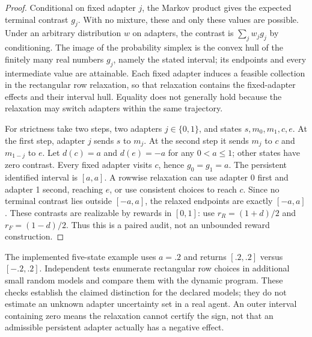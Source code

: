 \begin{proof}
Conditional on fixed adapter $j$, the Markov product gives the expected terminal contrast $g_j$. With no mixture, these and only these values are possible. Under an arbitrary distribution $w$ on adapters, the contrast is $\sum_jw_jg_j$ by conditioning. The image of the probability simplex is the convex hull of the finitely many real numbers $g_j$, namely the stated interval; its endpoints and every intermediate value are attainable. Each fixed adapter induces a feasible collection in the rectangular row relaxation, so that relaxation contains the fixed-adapter effects and their interval hull. Equality does not generally hold because the relaxation may switch adapters within the same trajectory.

For strictness take two steps, two adapters $j\in\{0,1\}$, and states $s,m_0,m_1,c,e$. At the first step, adapter $j$ sends $s$ to $m_j$. At the second step it sends $m_j$ to $c$ and $m_{1-j}$ to $e$. Let $d(c)=a$ and $d(e)=-a$ for any $0<a\leq1$; other states have zero contrast. Every fixed adapter visits $c$, hence $g_0=g_1=a$. The persistent identified interval is $[a,a]$. A rowwise relaxation can use adapter 0 first and adapter 1 second, reaching $e$, or use consistent choices to reach $c$. Since no terminal contrast lies outside $[-a,a]$, the relaxed endpoints are exactly $[-a,a]$. These contrasts are realizable by rewards in $[0,1]$: use $r_R=(1+d)/2$ and $r_F=(1-d)/2$. Thus this is a paired audit, not an unbounded reward construction.
\end{proof}

The implemented five-state example uses $a=.2$ and returns $[.2,.2]$ versus $[-.2,.2]$. Independent tests enumerate rectangular row choices in additional small random models and compare them with the dynamic program. These checks establish the claimed distinction for the declared models; they do not estimate an unknown adapter uncertainty set in a real agent. An outer interval containing zero means the relaxation cannot certify the sign, not that an admissible persistent adapter actually has a negative effect.

